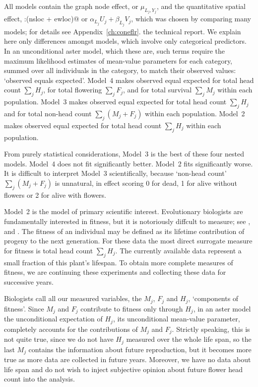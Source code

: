 All models contain the graph node effect, \verb@varb@ or $\mu_{L_j, Y_j}$,
and the quantitative spatial effect, \verb@level:(nsloc + ewloc)@
or $\alpha_{L_j} U_j + \beta_{L_j} V_j$, which was chosen by
comparing many models; for details see
{Appendix~\ref{ch:coneflr}.}
{the technical report.}
We explain here only differences amongst models, which involve only
categorical predictors.
In an unconditional aster model, which these are, such terms
require the maximum likelihood estimates of mean-value parameters for each category,
summed over all individuals in the category, to match their observed
values: `observed equals expected'.
Model~4 makes observed equal expected
for total head count $\sum_j H_j$,
for total flowering $\sum_j F_j$, and
for total survival $\sum_j M_j$
within each population.
Model~3 makes observed equal expected
for total head count $\sum_j H_j$ and
for total non-head count $\sum_j (M_j + F_j)$
within each population.
Model~2 makes observed equal expected
for total head count $\sum_j H_j$
within each population.

From purely statistical considerations, Model~3 is the best of these
four nested models.  Model~4 does not fit significantly better.
Model~2 fits significantly worse.
It is difficult to interpret Model~3 scientifically,
because
`non-head count' $\sum_j (M_j + F_j)$ is unnatural, in effect scoring 0 for dead,
1 for alive without flowers or 2 for alive with flowers.

Model~2 is the model of primary scientific interest.
Evolutionary biologists are fundamentally interested in fitness,
but it is notoriously diffcult to measure;
see \citet{beatty}, \citet{keller} and \citet{paul}.
The fitness of an individual may be defined as its
lifetime contribution of progeny to the next generation.
For these
data the most direct surrogate measure for fitness is
total head count $\sum_j H_j$.
The currently available data represent a small fraction of this plant's
lifespan.  To obtain more complete measures of fitness, we are continuing
these experiments and collecting these data for successive years.

Biologists call all our measured variables,
the $M_j$, $F_j$ and $H_j$, `components of fitness'.
Since $M_j$ and $F_j$ contribute to fitness only through $H_j$,
in an aster model the unconditional expectation of $H_j$,
its unconditional mean-value parameter, completely accounts
for the contributions
of $M_j$ and $F_j$.  Strictly speaking, this is not quite true, since
we do not have $H_j$ measured over the whole life span, so the last $M_j$
contains the information about future reproduction,
but it becomes more true as more data are collected in future years.
Moreover, we have no data about life span and do not wish to inject
subjective opinion about future flower head count into the analysis.

